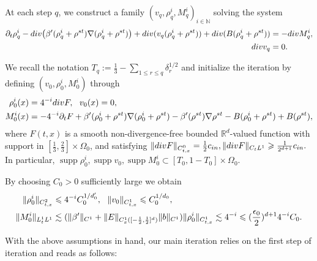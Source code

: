 \documentclass[10pt,a4paper]{amsart}
\numberwithin{equation}{section}
\DeclareMathOperator{\supp}{supp}
\def\mR{{\mathbb R}}
\def\geq{\geqslant}
\def\leq{\leqslant}
\def\div{\mathord{{\rm div}}}
\def\geq{\geqslant}
\def\leq{\leqslant}
\def\div{\mathord{{\rm div}}}
\begin{document}
At each step $q$, we construct a family
$(v_q,\rho_q^i,M_q^i)_{i\in\mathbb{N}}$
solving the system
\begin{align}\label{R:eq:4qth}
\partial_t\rho_q^i
-
\div \bigl(\beta'(\rho_q^i+\rho^{st})\nabla(\rho_q^i+\rho^{st})\bigr)
+
\div(v_q(\rho_q^i+\rho^{st}))+\div(B(\rho_q^i+\rho^{st}))
&=
-\div M_q^i,
\\
\div v_q&=0.
\notag
\end{align}

 We recall the notation $
T_q:=\frac13-\sum_{1\leq r\leq q}\delta_r^{1/2}
$ and initialize the iteration by defining
$
(v_0,\rho^i_0,M^i_0)
$
through
\begin{align*}
\rho^i_0(x)
&=
 4^{-i}\div F,
\ \
v_0(x)=0,
\\ 
M^i_0(x)
&=-4^{-i}\partial_t F+\beta'(\rho_0^i+\rho^{st})\nabla(\rho_0^i+\rho^{st})-\beta'(\rho^{st})\nabla\rho^{st}
-B(\rho_0^i+\rho^{st})+B( \rho^{st}),
\end{align*}
where
$  F(t,x)$ is a smooth non-divergence-free bounded $\mR^d$-valued function with support in $[\frac13,\frac23]\times \Omega_0$, and satisfying $\|\div F\|_{C_{t,x}^0}=\frac1 2 c_{in}, \|\div F\|_{C_tL^1}\geq \frac1 {2^{d+1}} c_{in}.$ In particular, $\supp\rho_0^i,\supp v_0,\supp M_0^i\subset [T_0,1-T_0]\times \Omega_0$. 
 
  By choosing $C_0>0$ sufficiently large we obtain  
\begin{align}
\| \rho_0^i\|_{C_{t,x}^2}
& 
\leq
4^{-i}C_0^{1/d_0'},\ \ \|v_0\|_{C_{t,x}^1}\leq C_0^{1/d_0},
\notag\\
\|M_0^i\|_{L_t^1L^1}
&\lesssim  (\|\beta' \|_{C^1 }+\|E \|_{C_{x}^1([-\frac12,\frac12]^d)}\|b\|_{C^1})\|\rho_0^i\|_{C_{t,x}^1}\lesssim 
4^{-i}
\leq
(\frac{\epsilon_0}{2})^{d+1}4^{-i}C_0.
\label{R:bd:4rho_0,M_0}
\end{align} 

 

With the above assumptions in hand, our main iteration relies on the first step of iteration and reads as follows:
\end{document}
